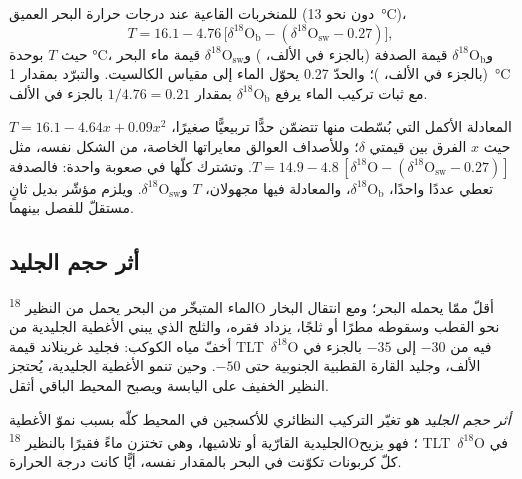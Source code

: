 \begin{proposition}\label{prop:b2:climate-proxies:benthic}
للمنخربات القاعية عند درجات حرارة البحر العميق (دون نحو \qty{13}{\celsius})،
\[
  T = 16.1 - 4.76\,\bigl[\delta^{18}\mathrm{O}_{\mathrm{b}} - (\delta^{18}\mathrm{O}_{\mathrm{sw}} -
  0.27)\bigr],
\]
حيث $T$ بوحدة \unit{\celsius}، و$\delta^{18}\mathrm{O}_{\mathrm{b}}$ قيمة الصدفة (بالجزء في الألف،
) و$\delta^{18}\mathrm{O}_{\mathrm{sw}}$ قيمة ماء البحر (بالجزء في الألف، )؛ والحدّ
0.27 يحوّل الماء إلى مقياس الكالسيت. والتبرّد بمقدار \qty{1}{\celsius} مع ثبات
تركيب الماء يرفع $\delta^{18}\mathrm{O}_{\mathrm{b}}$ بمقدار $1/4.76 = 0.21$ بالجزء في الألف.
\end{proposition}
\admitted

المعادلة الأكمل التي بُسّطت منها تتضمّن حدًّا تربيعيًّا صغيرًا،
$T = 16.1 - 4.64x + 0.09x^2$ حيث $x$ الفرق بين قيمتي $\delta$؛ وللأصداف العوالق
معايراتها الخاصة، من الشكل نفسه، مثل $T = 14.9 - 4.8\,[\delta^{18}\mathrm{O} -
(\delta^{18}\mathrm{O}_{\mathrm{sw}} - 0.27)]$. وتشترك كلّها في صعوبة واحدة: فالصدفة تعطي
عددًا واحدًا، $\delta^{18}\mathrm{O}_{\mathrm{b}}$، والمعادلة فيها مجهولان، $T$
و$\delta^{18}\mathrm{O}_{\mathrm{sw}}$. ويلزم مؤشّر بديل ثانٍ مستقلّ للفصل بينهما.

\subsection*{أثر حجم الجليد}

الماء المتبخّر من البحر يحمل من النظير \textsuperscript{18}O أقلّ ممّا يحمله البحر؛ ومع انتقال البخار
نحو القطب وسقوطه مطرًا أو ثلجًا، يزداد فقره، والثلج الذي يبني الأغطية
الجليدية من أخفّ مياه الكوكب: فجليد غرينلاند قيمة \mbox{\textdir TLT $\delta^{18}$O} فيه من $-30$ إلى $-35$
بالجزء في الألف، وجليد القارة القطبية الجنوبية حتى $-50$. وحين تنمو الأغطية الجليدية، يُحتجز النظير الخفيف على اليابسة
ويصبح المحيط الباقي أثقل.

\begin{definition}\label{def:b2:climate-proxies:ice-volume}
\emph{أثر حجم الجليد} هو تغيّر التركيب النظائري للأكسجين
في المحيط كلّه بسبب نموّ الأغطية الجليدية القارّية أو تلاشيها، وهي
تختزن ماءً فقيرًا بالنظير \textsuperscript{18}O؛ فهو يزيح \mbox{\textdir TLT $\delta^{18}$O} في كلّ كربونات
تكوّنت في البحر بالمقدار نفسه، أيًّا كانت درجة الحرارة.
\end{definition}

